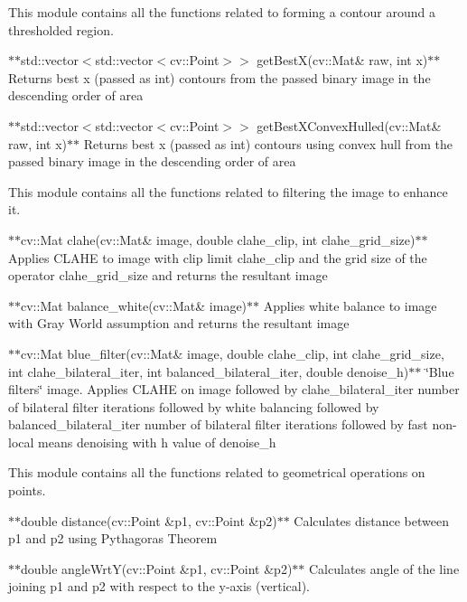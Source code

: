 This module contains all the functions related to forming a contour around a thresholded region.


\begin{DoxyItemize}
\item $\ast$$\ast${\ttfamily std\+::vector$<$std\+::vector$<$cv\+::\+Point$>$$>$ get\+Best\+X(cv\+::\+Mat\& raw, int x)}$\ast$$\ast$ Returns best x (passed as int) contours from the passed binary image in the descending order of area
\item $\ast$$\ast${\ttfamily std\+::vector$<$std\+::vector$<$cv\+::\+Point$>$$>$ get\+Best\+X\+Convex\+Hulled(cv\+::\+Mat\& raw, int x)}$\ast$$\ast$ Returns best x (passed as int) contours using convex hull from the passed binary image in the descending order of area
\end{DoxyItemize}

This module contains all the functions related to filtering the image to enhance it.


\begin{DoxyItemize}
\item $\ast$$\ast${\ttfamily cv\+::\+Mat clahe(cv\+::\+Mat\& image, double clahe\+\_\+clip, int clahe\+\_\+grid\+\_\+size)}$\ast$$\ast$ Applies C\+L\+A\+HE to {\ttfamily image} with clip limit {\ttfamily clahe\+\_\+clip} and the grid size of the operator {\ttfamily clahe\+\_\+grid\+\_\+size} and returns the resultant image
\item $\ast$$\ast${\ttfamily cv\+::\+Mat balance\+\_\+white(cv\+::\+Mat\& image)}$\ast$$\ast$ Applies white balance to {\ttfamily image} with Gray World assumption and returns the resultant image
\item $\ast$$\ast${\ttfamily cv\+::\+Mat blue\+\_\+filter(cv\+::\+Mat\& image, double clahe\+\_\+clip, int clahe\+\_\+grid\+\_\+size, int clahe\+\_\+bilateral\+\_\+iter, int balanced\+\_\+bilateral\+\_\+iter, double denoise\+\_\+h)}$\ast$$\ast$ \char`\"{}\+Blue filters\char`\"{} {\ttfamily image}. Applies C\+L\+A\+HE on {\ttfamily image} followed by {\ttfamily clahe\+\_\+bilateral\+\_\+iter} number of bilateral filter iterations followed by white balancing followed by {\ttfamily balanced\+\_\+bilateral\+\_\+iter} number of bilateral filter iterations followed by fast non-\/local means denoising with h value of {\ttfamily denoise\+\_\+h}
\end{DoxyItemize}

This module contains all the functions related to geometrical operations on points.


\begin{DoxyItemize}
\item $\ast$$\ast${\ttfamily double distance(cv\+::\+Point \&p1, cv\+::\+Point \&p2)}$\ast$$\ast$ Calculates distance between {\ttfamily p1} and {\ttfamily p2} using Pythagoras\textquotesingle{} Theorem
\item $\ast$$\ast${\ttfamily double angle\+Wrt\+Y(cv\+::\+Point \&p1, cv\+::\+Point \&p2)}$\ast$$\ast$ Calculates angle of the line joining {\ttfamily p1} and {\ttfamily p2} with respect to the y-\/axis (vertical).
\end{DoxyItemize}

